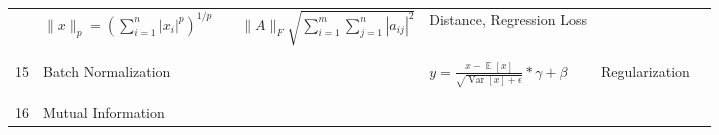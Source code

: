 \documentclass[twoside,twocolumn]{article}
\begin{document}
\begin{table}
{\begin{tabular}{p{0.2cm} p{6cm} p{12cm} p{6cm} p{4cm}}
      & $\displaystyle \| x  \|_p = \left( \sum_{i=1}^n |x_i|^p \right)^{1/p} \qquad \| A \|_F \sqrt{\sum_{i=1}^m \sum_{j=1}^n |a_{ij}|^2 }$
            & Distance, Regression Loss      &
    \\ \\ \\
    15 &  Batch Normalization
      & $\displaystyle y = \frac{x - \mathop{\mathbb{E}} \left[ x \right]}{\sqrt{\operatorname{Var}\left[ x \right] + \epsilon}} \ast \gamma + \beta$      & Regularization      & \cite{batchnorm}
    \\ \\ \\
    16 &  Mutual Information
      &       &       &
    \\
    \bottomrule
  \end{tabular}
  }
  \caption{}
  \label{}

\end{table}





\end{document}
